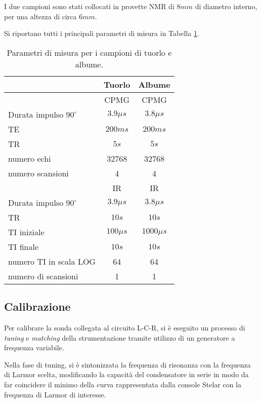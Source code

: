 I due campioni sono stati collocati in provette NMR di $8\si{mm}$ di diametro interno, per una altezza di circa $6\si{mm}$.

Si riportano tutti i principali parametri di misura in Tabella \ref{tab:setup}.

\begin{table}
	\centering
	\begin{tabular}{|l|c|c|}
	\toprule
						& \textbf{Tuorlo}& \textbf{Albume}	\\
	\midrule
						& CPMG 			& CPMG 				\\
	\midrule
	Durata impulso $90^{\circ}$ & $3.9\si{\mu s} $& $3.8\si{\mu s}$ \\
	TE 					& $200\si{ms} $	& $200\si{ms}$ \\
	TR 					& $5\si{s}$ 	& $5\si{s}$ \\
	numero echi 		& 32768 		& 32768 \\
	numero scansioni 	& 4 			& 4 \\
	\midrule
	\midrule
						& IR			& IR				\\
	\midrule
	Durata impulso $90^{\circ}$ & $3.9\si{\mu s} $& $3.8\si{\mu s}$ \\
	TR 					& $10\si{s}$	& $10\si{s}$ \\
	TI iniziale 	 	&$100\si{\mu s}$& $1000\si{\mu s}$ \\
	TI finale 		 	& $10\si{s}$	& $10\si{s}$ \\
	numero TI in scala LOG & 64			& 64 \\
	numero di scansioni & 1				& 1 \\
	\bottomrule
	\end{tabular}
	\caption{Parametri di misura per i campioni di tuorlo e albume.}
	\label{tab:setup}
\end{table}

\subsection*{Calibrazione}

Per calibrare la sonda collegata al circuito L-C-R, si è eseguito un processo di \textit{tuning} e \textit{matching} della strumentazione tramite utilizzo di un generatore a frequenza variabile.

Nella fase di tuning, si è sintonizzata la frequenza di risonanza con la frequenza di Larmor scelta, modificando la capacità del condensatore in serie in modo da far coincidere il minimo della curva rappresentata dalla console Stelar con la frequenza di Larmor di interesse.

